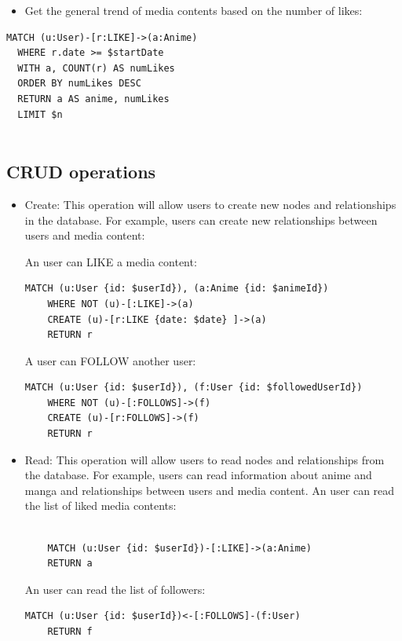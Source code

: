 \begin{itemize}
  \item Get the general trend of media contents based on the number of likes:
\end{itemize}
\begin{lstlisting}[language=Cypher, caption=GetMediaContentTrendByLikes]
  MATCH (u:User)-[r:LIKE]->(a:Anime)
  WHERE r.date >= $startDate
  WITH a, COUNT(r) AS numLikes
  ORDER BY numLikes DESC
  RETURN a AS anime, numLikes
  LIMIT $n
  
\end{lstlisting}


\subsection{CRUD operations}
\begin{itemize}
    \item Create: This operation will allow users to create new nodes and relationships in the database. For example, users can create new relationships between users and media content:
    
    An user can LIKE a media content: 
    \begin{lstlisting}[language=Cypher, caption=Create Like Relationship]
    MATCH (u:User {id: $userId}), (a:Anime {id: $animeId}) 
    WHERE NOT (u)-[:LIKE]->(a) 
    CREATE (u)-[r:LIKE {date: $date} ]->(a)
    RETURN r
    \end{lstlisting}

    A user can FOLLOW another user:
    \begin{lstlisting}[language=Cypher, caption=Create Follow Relationship]
    MATCH (u:User {id: $userId}), (f:User {id: $followedUserId}) 
    WHERE NOT (u)-[:FOLLOWS]->(f) 
    CREATE (u)-[r:FOLLOWS]->(f) 
    RETURN r
    \end{lstlisting}

    \item Read: This operation will allow users to read nodes and relationships from the database. For example, users can read information about anime and manga and relationships between users and media content.
    An user can read the list of liked media contents:
    \begin{lstlisting}[language=Cypher, caption=Read Liked Media Contents]
  
    MATCH (u:User {id: $userId})-[:LIKE]->(a:Anime)
    RETURN a
    \end{lstlisting}

    An user can read the list of followers:
    \begin{lstlisting}[language=Cypher, caption=Read Followers]
    MATCH (u:User {id: $userId})<-[:FOLLOWS]-(f:User)
    RETURN f
    \end{lstlisting}
  

\end{itemize}
